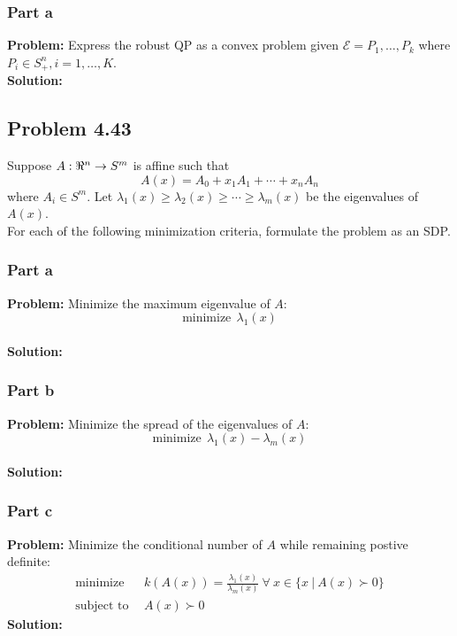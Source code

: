 \documentclass[letter]{article}
\begin{document}
\subsubsection{Part a}
\textbf{Problem:}
Express the robust QP as a convex problem given $\mathcal{E} = {P_1,\dots,P_k}$ where $P_i\in S^n_+, i = 1,\dots,K$.\\

\textbf{Solution:}







\newpage
\subsection{Problem 4.43}
Suppose $A: \real^n \to S^m$ is affine such that
\begin{equation}
	A(x) = A_0 + x_1 A_1 + \cdots + x_n A_n
\end{equation}
where $A_i \in S^m$. Let $\lambda_1(x) \geq \lambda_2(x) \geq \cdots \geq \lambda_m(x)$ be the eigenvalues of $A(x)$.\\


For each of the following minimization criteria, formulate the problem as an SDP.\\

\subsubsection{Part a}
\textbf{Problem:}
Minimize the maximum eigenvalue of $A$: $$\text{minimize} \ \ \lambda_1(x)$$\\
\textbf{Solution:}





\subsubsection{Part b}
\textbf{Problem:}
Minimize the spread of the eigenvalues of $A$: $$\text{minimize} \ \ \lambda_1(x) - \lambda_m(x)$$\\
\textbf{Solution:}










\subsubsection{Part c}
\textbf{Problem:}
Minimize the conditional number of $A$ while remaining postive definite:
\begin{equation*}
	\begin{aligned}
		\text{minimize} \ \ &k(A(x)) = \frac{\lambda_1(x)}{\lambda_m(x)} \ \forall \ x \in \{x \ | \ A(x) \succ 0\}\\
		 \text{subject to} \ \ &A(x) \succ 0
	\end{aligned}
\end{equation*}
\textbf{Solution:}
\end{document}
